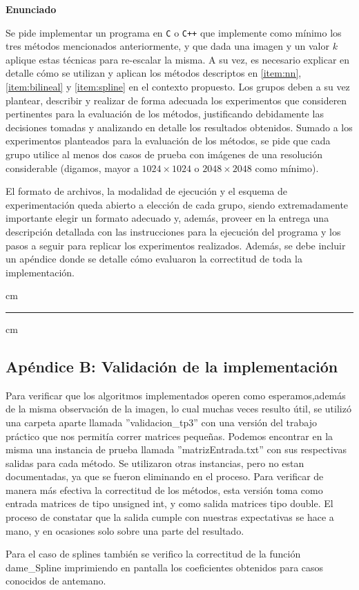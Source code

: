 \documentclass[a4paper]{article}
\begin{document}
\vskip 5pt

{\bf\noindent Enunciado}

Se pide implementar un programa en \verb-C- o \verb-C++- que implemente como m\'inimo los tres m\'etodos mencionados anteriormente, y que dada una imagen y un valor $k$ aplique estas t\'ecnicas para re-escalar la misma. A su vez, es necesario explicar en detalle c\'omo se utilizan y aplican los m\'etodos descriptos en \ref{item:nn}, \ref{item:bilineal} y \ref{item:spline} en el contexto propuesto. Los grupos deben a su vez plantear, describir y realizar de forma adecuada los experimentos que consideren pertinentes para la evaluaci\'on de los m\'etodos, justificando debidamente las decisiones tomadas y analizando en detalle los resultados obtenidos. Sumado a los experimentos planteados para la evaluaci\'on de los m\'etodos, se pide que cada grupo utilice al menos dos casos de prueba con im\'agenes de una resoluci\'on considerable (digamos, mayor a $1024\times 1024$ o $2048\times 2048$ como m\'inimo).

El formato de archivos, la modalidad de ejecuci\'on y el esquema de experimentaci\'on queda abierto a elecci\'on de cada grupo, siendo extremadamente importante elegir un formato adecuado y, adem\'as, proveer en la entrega una descripci\'on detallada con las instrucciones para la ejecuci\'on del programa y los pasos a seguir para replicar los experimentos realizados. Adem\'as, se debe incluir un ap\'endice donde se detalle c\'omo evaluaron la correctitud de toda la implementaci\'on.

 cm
\hrule
{} cm


\subsection*{Apéndice B: Validación de la implementación}

Para verificar que los algoritmos implementados operen como esperamos,además de la misma observación de la imagen, lo cual muchas veces resulto útil, se utiliz\'o una carpeta aparte llamada ''validacion_tp3'' con una versión del trabajo práctico que nos permitía correr matrices pequeñas. Podemos encontrar en la misma una instancia de prueba llamada ''matrizEntrada.txt'' con sus respectivas salidas para cada método. Se utilizaron otras instancias, pero no estan documentadas, ya que se fueron eliminando en el proceso. Para verificar de manera m\'as efectiva la correctitud de los métodos, esta versión toma como entrada matrices de tipo unsigned int, y como salida matrices tipo double. El proceso de constatar que la salida cumple con nuestras expectativas se hace a mano, y en ocasiones solo sobre una parte del resultado.

Para el caso de splines también se verifico la correctitud de la función dame_Spline imprimiendo en pantalla los coeficientes obtenidos para casos conocidos de antemano.
\end{document}
